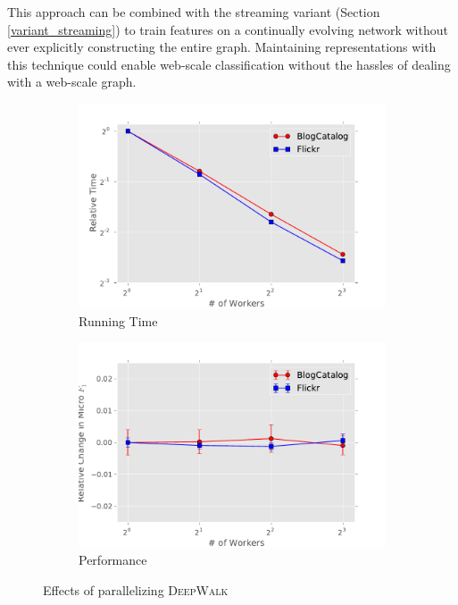 \documentclass{sig-alternate}
\newcommand{\ouralgorithm}{\textsc{DeepWalk}}
\begin{document}
This approach can be combined with the streaming variant (Section \ref{variant_streaming}) to train features on a continually evolving network without ever explicitly constructing the entire graph.  
Maintaining representations with this technique could enable web-scale classification without the hassles of dealing with a web-scale graph.

\begin{figure}[t!]
\centering
\begin{subfigure}[b]{0.5\columnwidth}	
\centering
\includegraphics[width=\columnwidth]{figures/scalability_time.pdf}
\caption{Running Time}
\label{fig:parallel_speed}
\end{subfigure}%
\begin{subfigure}[b]{0.5\columnwidth}	
\centering
 \includegraphics[width=\columnwidth]{figures/scalability_perf.pdf}
\caption{Performance} 
\label{fig:parallel_performance}
\end{subfigure}
\caption{Effects of parallelizing \ouralgorithm}
\label{fig:parallel}
\end{figure}
\end{document}
